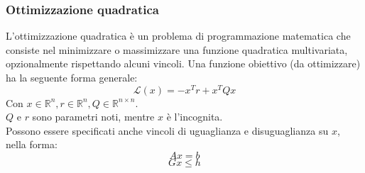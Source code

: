 \documentclass[binding=0.6cm]{sapthesis}
\begin{document}
				\subsubsection{Ottimizzazione quadratica}
					L'ottimizzazione quadratica è un problema di programmazione matematica che consiste nel minimizzare o massimizzare una funzione quadratica multivariata, opzionalmente rispettando alcuni
					vincoli. Una funzione obiettivo (da ottimizzare) ha la seguente forma generale:
					\[
						\mathcal{L}(x) = - x^Tr + x^TQx
					\]
					Con $x \in \mathbb{R}^n, r \in \mathbb{R}^n, Q \in \mathbb{R}^{n \times n}$. \\
					$Q$ e $r$ sono parametri noti, mentre $x$ è l'incognita. \\
					Possono essere specificati anche vincoli di uguaglianza e disuguaglianza su $x$, nella forma:
					\[
						Ax = b
					\]
					\[
						Gx \leq h
					\]
\end{document}
